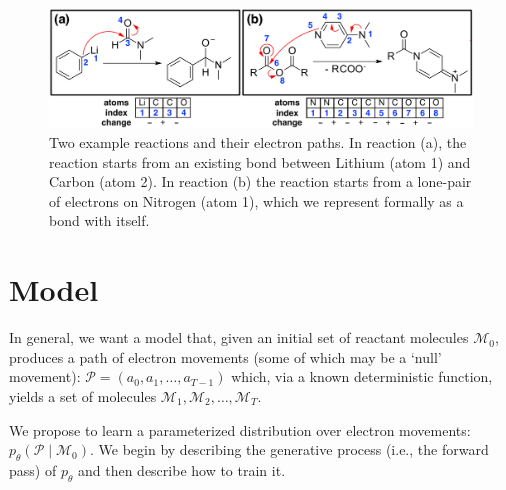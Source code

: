 \documentclass{article}
\newcommand{\Mc}{{\mathcal{M}}}
\newcommand{\Pc}{{\mathcal{P}}}
\begin{document}
\begin{figure}
\centering
\includegraphics[width=\textwidth]{rxn_example}
\vspace{-3ex}
\caption{Two example reactions and their electron paths. In reaction (a), the reaction starts from an existing bond between Lithium (atom 1) and Carbon (atom 2). In reaction (b) the reaction starts from a lone-pair of electrons on Nitrogen (atom 1), which we represent formally as a bond with itself.}
\label{fig:example}
\end{figure}

\section{Model}
In general, we want a model that, given an initial set of reactant molecules $\Mc_0$, produces a path of electron movements (some of which may be a `null' movement): $\Pc = (a_0, a_1, \ldots, a_{T-1})$ which, via a known deterministic function, yields a set of molecules $\Mc_1, \Mc_2, \ldots, \Mc_T$. 




We propose to learn a parameterized distribution over electron movements: $p_\theta( \Pc \mid \Mc_0)$. We begin by describing the generative process (i.e., the forward pass) of $p_\theta$ and then describe how to train it.
\end{document}
